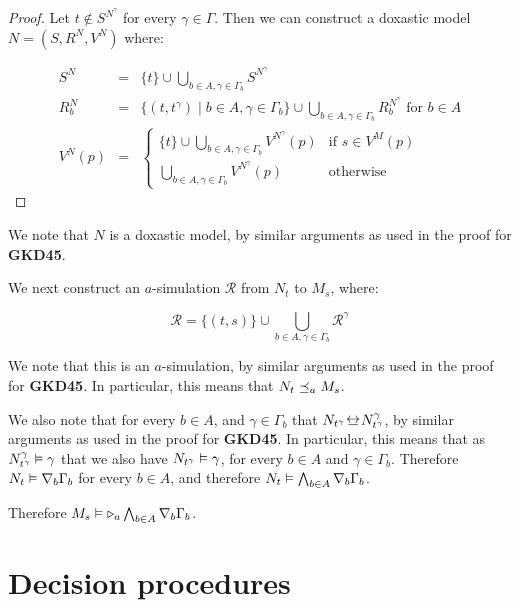 \begin{proof}
Let $t \notin S^{N^\gamma}$ for every $\gamma \in \Gamma$.
Then we can construct a doxastic model $N = (S, R^N, V^N)$ where:

\begin{eqnarray*}
S^N &=& \{t\} \cup \bigcup_{b \in A, \gamma \in \Gamma_b} S^{N^\gamma}\\
R^N_b &=& \{(t, t^{\gamma}) \mid b \in A, \gamma \in \Gamma_b\} \cup
\bigcup_{b \in A, \gamma \in \Gamma_b} R^{N^\gamma}_b \text{ for $b \in A$}\\
V^N(p) &=& 
\begin{cases}
\{t\} \cup \bigcup_{b \in A, \gamma \in \Gamma_b} V^{N^\gamma}(p) & \text{if $s
\in V^M(p)$}\\
\bigcup_{b \in A, \gamma \in \Gamma_b} V^{N^\gamma}(p) & \text{otherwise}
\end{cases}
\end{eqnarray*}
\end{proof}

We note that $N$ is a doxastic model, by similar arguments as used in the proof
for {\bf GKD45}.

We next construct an $a$-simulation $\mathcal{R}$ from $N_t$ to $M_s$, where:

$$\mathcal{R} = \{(t, s)\} \cup \bigcup_{b \in A, \gamma \in \Gamma_b}
\mathcal{R}^\gamma$$

We note that this is an $a$-simulation, by similar arguments as used in the
proof for {\bf GKD45}. In particular, this means that $N_t \preceq_a M_s$.

We also note that for every $b \in A$, and $\gamma \in \Gamma_b$ that
$N_{t^\gamma} \bisim N^\gamma_{t^\gamma}$, by similar arguments as used in the
proof for {\bf GKD45}. In particular, this means that as $N^\gamma_{t^\gamma}
\vDash \gamma$ that we also have $N_{t^\gamma} \vDash \gamma$, for every $b
\in A$ and $\gamma \in \Gamma_b$. Therefore $N_t \vDash \nabla_b \Gamma_b$
for every $b \in A$, and therefore $N_t \vDash \bigwedge_{b \in A} \nabla_b
\Gamma_b$.

Therefore $M_s \vDash {\ensuremath{\mathopen{\triangleright}}}_a \bigwedge_{b \in A} \nabla_b \Gamma_b$.

\section{Decision procedures}
